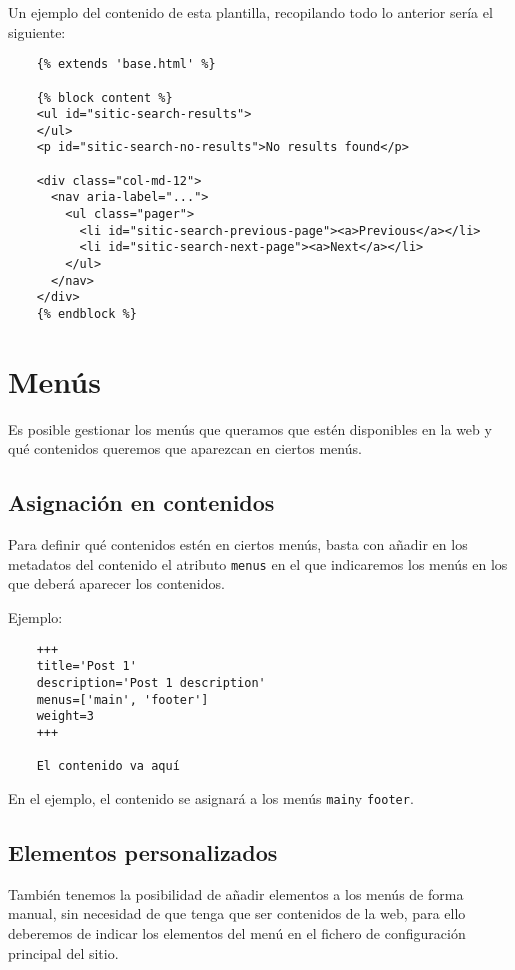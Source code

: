 Un ejemplo del contenido de esta plantilla, recopilando todo lo anterior sería el siguiente:

\begin{verbatim}
    {% extends 'base.html' %}

    {% block content %}
    <ul id="sitic-search-results">
    </ul>
    <p id="sitic-search-no-results">No results found</p>

    <div class="col-md-12">
      <nav aria-label="...">
        <ul class="pager">
          <li id="sitic-search-previous-page"><a>Previous</a></li>
          <li id="sitic-search-next-page"><a>Next</a></li>
        </ul>
      </nav>
    </div>
    {% endblock %}
\end{verbatim}


\section{Menús}

Es posible gestionar los menús que queramos que estén disponibles en la web y qué contenidos
queremos que aparezcan en ciertos menús.

\subsection{Asignación en contenidos}

Para definir qué contenidos estén en ciertos menús, basta con añadir en los metadatos del contenido
el atributo \texttt{menus} en el que indicaremos los menús en los que deberá aparecer
los contenidos.

Ejemplo:

\begin{verbatim}
    +++
    title='Post 1'
    description='Post 1 description'
    menus=['main', 'footer']
    weight=3
    +++

    El contenido va aquí
\end{verbatim}

En el ejemplo, el contenido se asignará a los menús \texttt{main}y \texttt{footer}.

\subsection{Elementos personalizados}

También tenemos la posibilidad de añadir elementos a los menús de forma manual, sin necesidad de que
tenga que ser contenidos de la web, para ello deberemos de indicar los elementos del menú en el fichero
de configuración principal del sitio.

